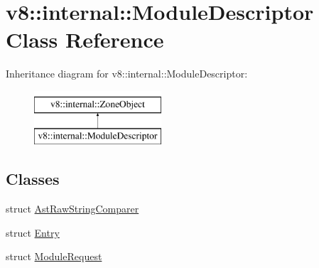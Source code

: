 \hypertarget{classv8_1_1internal_1_1ModuleDescriptor}{}\section{v8\+:\+:internal\+:\+:Module\+Descriptor Class Reference}
\label{classv8_1_1internal_1_1ModuleDescriptor}
Inheritance diagram for v8\+:\+:internal\+:\+:Module\+Descriptor\+:\begin{figure}[H]
\begin{center}
\leavevmode
\includegraphics[height=2.000000cm]{classv8_1_1internal_1_1ModuleDescriptor}
\end{center}
\end{figure}
\subsection*{Classes}
\begin{DoxyCompactItemize}
\item 
struct \mbox{\hyperlink{structv8_1_1internal_1_1ModuleDescriptor_1_1AstRawStringComparer}{Ast\+Raw\+String\+Comparer}}
\item 
struct \mbox{\hyperlink{structv8_1_1internal_1_1ModuleDescriptor_1_1Entry}{Entry}}
\item 
struct \mbox{\hyperlink{structv8_1_1internal_1_1ModuleDescriptor_1_1ModuleRequest}{Module\+Request}}
\end{DoxyCompactItemize}
